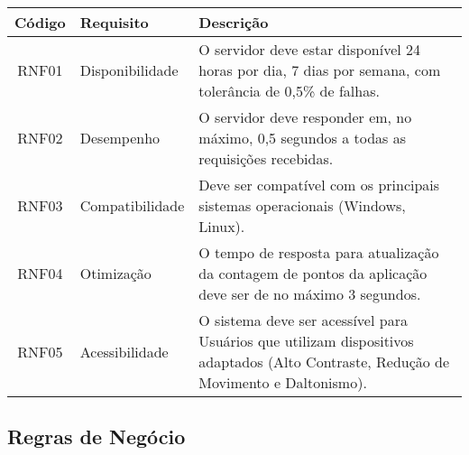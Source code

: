 \documentclass[
	article,			%
	12pt,				%
	oneside,			%
	a4paper,			%
	english,			%
	brazil,				%
	sumario=tradicional
	]{abntex2}
\begin{document}
\begin{center}
\vspace{-0.0cm}

\begin{tabular}{|c|l|p{8cm}|}
\hline
\textbf{Código} & \textbf{Requisito} & \textbf{Descrição} \\
\hline
RNF01 & Disponibilidade & O servidor deve estar disponível 24 horas por dia, 7 dias por semana, com tolerância de 0,5\% de falhas. \\
\hline
RNF02 & Desempenho & O servidor deve responder em, no máximo, 0,5 segundos a todas as requisições recebidas. \\
\hline
RNF03 & Compatibilidade & Deve ser compatível com os principais sistemas operacionais (Windows, Linux). \\
\hline
RNF04 & Otimização & O tempo de resposta para atualização da contagem de pontos da aplicação deve ser de no máximo 3 segundos. \\
\hline
RNF05 & Acessibilidade & O sistema deve ser acessível para Usuários que utilizam dispositivos adaptados (Alto Contraste, Redução de Movimento e Daltonismo). \\
\hline
\end{tabular}
\end{center}

\subsection{Regras de Negócio}
\end{document}
